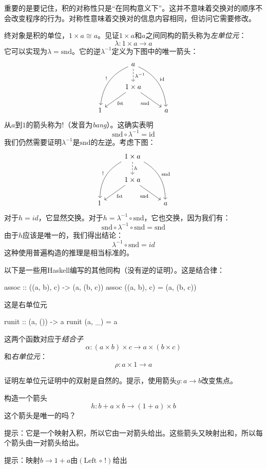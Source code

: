 \documentclass[DaoFP]{subfiles}
\begin{document}
重要的是要记住，积的对称性只是“在同构意义下”。这并不意味着交换对的顺序不会改变程序的行为。对称性意味着交换对的信息内容相同，但访问它需要修改。

终对象是积的单位，$1 \times a \cong a$。见证$1 \times a$和$a$之间同构的箭头称为\emph{左单位元}：
\[ \lambda \colon 1 \times a \to a \]
它可以实现为$\lambda = \text{snd}$。它的逆$\lambda^{-1}$定义为下图中的唯一箭头：
\[
 \begin{tikzcd}
 &a
 \arrow[d, dashed, "\lambda^{-1}"]
 \arrow[ddl, bend right, "!"']
 \arrow[ddr, bend left, "\text{id}"]
 \\
 & 1 \times a
  \arrow[dl,  "\text{fst}"]
 \arrow[dr,   "\text{snd}"']
 \\
1 && a
 \end{tikzcd}
 \]
从$a$到$1$的箭头称为\index{!}$!$（发音为\emph{bang}）。这确实表明
\[\text{snd} \circ \lambda^{-1} = \text{id} \] 
我们仍然需要证明$\lambda^{-1}$是$\text{snd}$的左逆。考虑下图：
\[
 \begin{tikzcd}
 &1 \times a
 \arrow[d, dashed, "h"]
 \arrow[ddl, bend right, "!"']
 \arrow[ddr, bend left, "\text{snd}"]
 \\
 & 1 \times a
  \arrow[dl,  "\text{fst}"]
 \arrow[dr,   "\text{snd}"']
 \\
1 && a
 \end{tikzcd}
 \]
 对于$h = id$，它显然交换。对于$h = \lambda^{-1}  \circ  \text{snd}$，它也交换，因为我们有：
 \[  \text{snd} \circ \lambda^{-1}  \circ  \text{snd} = \text{snd} \]
 由于$h$应该是唯一的，我们得出结论：
\[ \lambda^{-1}  \circ  \text{snd} = id \]
这种使用普遍构造的推理是相当标准的。

以下是一些用Haskell编写的其他同构（没有逆的证明）。这是结合律：
\begin{haskell}
assoc :: ((a, b), c) -> (a, (b, c))
assoc ((a, b), c) = (a, (b, c))
\end{haskell}
这是右单位元
\begin{haskell}
runit :: (a, ()) -> a
runit (a, _) = a
\end{haskell}

这两个函数对应于\emph{结合子}
\[ \alpha \colon (a \times b) \times c \to a \times (b \times c) \]
和\emph{右单位元}：
\[ \rho \colon a \times 1 \to a \]

\begin{exercise}
证明左单位元证明中的双射是自然的。提示，使用箭头$g \colon a \to b$改变焦点。
\end{exercise}

\begin{exercise}
构造一个箭头
\[ h \colon b + a \times b \to (1 + a) \times b \]
这个箭头是唯一的吗？

提示：它是一个映射入积，所以它由一对箭头给出。这些箭头又映射出和，所以每个箭头由一对箭头给出。

提示：映射$b \to 1 + a$由$(\text{Left} \, \circ \, !)$给出
\end{exercise}
\end{document}
